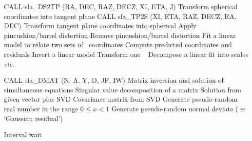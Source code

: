 \begin{callset}
     {CALL sla\_DS2TP (RA, DEC, RAZ, DECZ, XI, ETA, J)}
   Transform spherical coordinates into tangent plane
     {CALL sla\_TP2S (XI, ETA, RAZ, DECZ, RA, DEC)}
   Transform tangent plane coordinates into spherical
   Apply pincushion/barrel distortion
   Remove pincushion/barrel distortion
   Fit a linear model to relate two sets of \xy\ coordinates
   Compute predicted coordinates and residuals
   Invert a linear model
   Transform one \xy\
   Decompose a linear fit into scales {\it etc.}
\end{callset}

\begin{callset}
     {CALL sla\_DMAT (N, A, Y, D, JF, IW)}
   Matrix inversion and solution of simultaneous equations
   Singular value decomposition of a matrix
   Solution from given vector plus SVD
   Covariance matrix from SVD
   Generate pseudo-random real number in the range {$0 \leq x < 1$}
\subp{R~=~sla\_GRESID (S)}
   Generate pseudo-random normal deviate ($\equiv$ `Gaussian residual')
\end{callset}

\begin{callset}
    Interval wait
\end{callset}

\pagebreak

